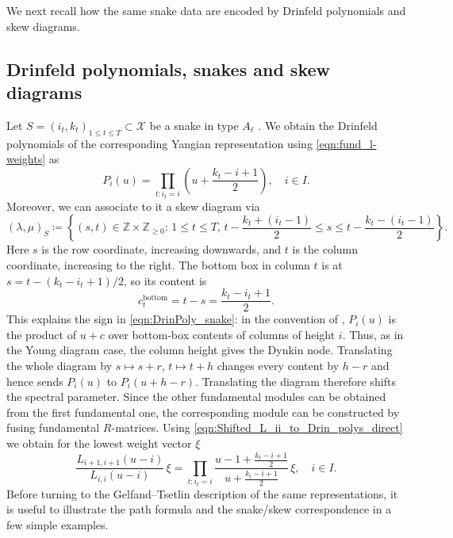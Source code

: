 \documentclass[12pt,reqno]{amsart}
\numberwithin{equation}{section}
\begin{document}
We next recall how the same snake data are encoded by Drinfeld polynomials and skew diagrams.



    \subsection{Drinfeld polynomials, snakes and skew diagrams}
	Let $S=(i_t,k_t)_{1\leq t\leq T}\subset\mathcal X$ be a snake in type $A_\ell$ \cite{MY,MY2} \cite{JuergensMaster}. We obtain the Drinfeld polynomials of the corresponding Yangian representation using \eqref{eqn:fund_l-weights} as
\begin{equation}
	P_i(u) = \prod_{t:i_t=i}\left(u+\frac{k_t-i+1}{2}\right),\quad i\in I.\label{eqn:DrinPoly_snake}
\end{equation}
Moreover, we can associate to it a skew diagram via \cite{NT1998,MY2}
\begin{equation}
	(\lambda,\mu)_{S}\coloneqq \left\{(s,t)\in \mathbb{Z}\times\mathbb{Z}_{\geq 0}:\,1\leq t\leq T,\,t-\frac{k_t+(i_t-1)}{2}\leq s \leq t-\frac{k_t-(i_t-1)}{2}\right\}.\label{eqn:snake_skew}
\end{equation}
Here $s$ is the row coordinate, increasing downwards, and $t$ is the
column coordinate, increasing to the right. The bottom box in column $t$
is at $s=t-(k_t-i_t+1)/2$, so its content is
\begin{equation*}
    c_t^{\mathrm{bottom}}=t-s=\frac{k_t-i_t+1}{2}.
\end{equation*}
This explains the sign in \eqref{eqn:DrinPoly_snake}: in the convention
of \cite[Eq.~(2.6)]{NT1998}, $P_i(u)$ is the product of $u+c$ over
bottom-box contents of columns of height $i$.
Thus, as in the Young diagram case, the column height gives the Dynkin node.
Translating the whole diagram by $s\mapsto s+r$, $t\mapsto t+h$
changes every content by $h-r$ and hence sends $P_i(u)$ to $P_i(u+h-r)$.
Translating the diagram therefore shifts the spectral parameter.
Since the other fundamental modules can be obtained from the first fundamental one, the corresponding module can be constructed by fusing fundamental $R$-matrices.
Using \eqref{eqn:Shifted_L_ii_to_Drin_polys_direct} we obtain for the lowest weight vector $\xi$
\begin{equation}
	\frac{L_{i+1,i+1}(u-i)}{L_{i,i}(u-i)}\,\xi = \prod_{t:i_t=i}\frac{u-1+\frac{k_t-i+1}{2}}{u+\frac{k_t-i+1}{2}}\,\xi,\quad i\in I.\label{eqn:Shifted_L_ii_to_Drin_polys}
\end{equation}
Before turning to the Gelfand--Tsetlin description of the same representations, it is useful to illustrate the path formula and the snake/skew correspondence in a few simple examples.
\end{document}
